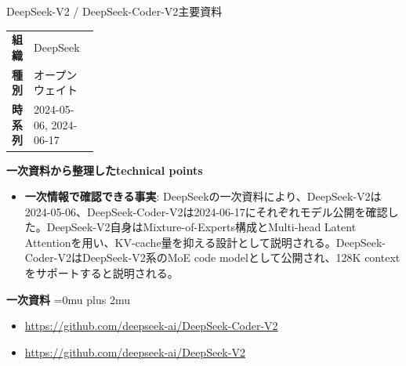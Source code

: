 \Needspace{0.38\textheight}
\begin{technicalnote}{DeepSeek-V2 / DeepSeek-Coder-V2}{主要資料}
\begingroup
\begin{tabularx}{\linewidth}{@{}>{\bfseries}p{0.22\linewidth}X@{}}
組織 & DeepSeek \\
種別 & オープンウェイト \\
時系列 & 2024-05-06, 2024-06-17 \\
\end{tabularx}
\smallskip
\begin{minipage}{\linewidth}
{\bfseries 一次資料から整理したtechnical points}
\begin{itemize}[leftmargin=1.5em,itemsep=0.35em]
\item \textbf{一次情報で確認できる事実}: DeepSeekの一次資料により、DeepSeek-V2は2024-05-06、DeepSeek-Coder-V2は2024-06-17にそれぞれモデル公開を確認した。DeepSeek-V2自身はMixture-of-Experts構成とMulti-head Latent Attentionを用い、KV-cache量を抑える設計として説明される。DeepSeek-Coder-V2はDeepSeek-V2系のMoE code modelとして公開され、128K contextをサポートすると説明される。
\end{itemize}
\begin{minipage}{\linewidth}
\begin{samepage}
{\bfseries 一次資料}
\begingroup\sloppy
\Urlmuskip=0mu plus 2mu\relax
\begin{itemize}[leftmargin=1.5em,itemsep=0.25em]
\item {\scriptsize\url{https://github.com/deepseek-ai/DeepSeek-Coder-V2}}
\item {\scriptsize\url{https://github.com/deepseek-ai/DeepSeek-V2}}
\end{itemize}
\endgroup
\end{samepage}
\end{minipage}
\end{minipage}
\endgroup
\end{technicalnote}
\medskip

